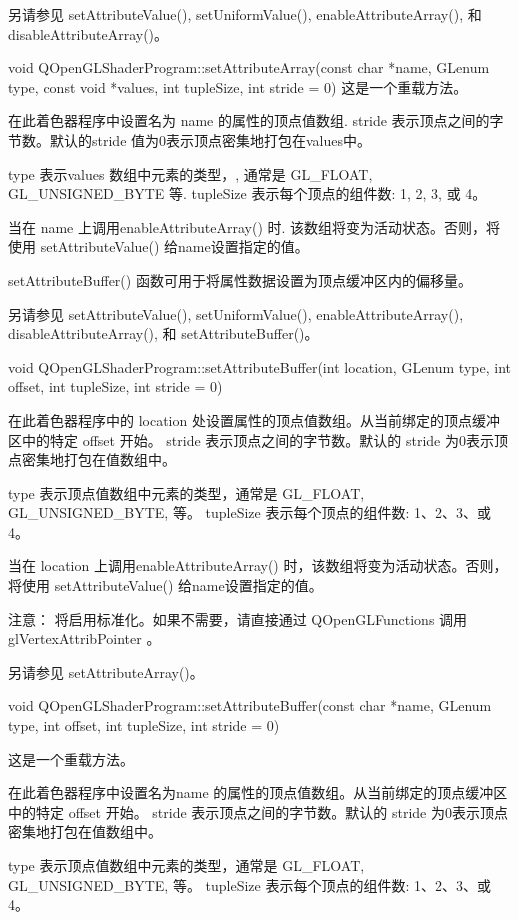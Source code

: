 另请参见 setAttributeValue(), setUniformValue(), enableAttributeArray(), 和 disableAttributeArray()。

void QOpenGLShaderProgram::setAttributeArray(const char *name, GLenum type, const void *values, int tupleSize, int stride = 0)
这是一个重载方法。

在此着色器程序中设置名为 name 的属性的顶点值数组. stride 表示顶点之间的字节数。默认的stride 值为0表示顶点密集地打包在values中。

type 表示values 数组中元素的类型，, 通常是 GL\_FLOAT, GL\_UNSIGNED\_BYTE 等. tupleSize 表示每个顶点的组件数: 1, 2, 3, 或 4。

当在 name 上调用enableAttributeArray() 时. 该数组将变为活动状态。否则，将使用 setAttributeValue() 给name设置指定的值。

setAttributeBuffer() 函数可用于将属性数据设置为顶点缓冲区内的偏移量。

另请参见 setAttributeValue(), setUniformValue(), enableAttributeArray(), disableAttributeArray(), 和 setAttributeBuffer()。

void QOpenGLShaderProgram::setAttributeBuffer(int location, GLenum type, int offset, int tupleSize, int stride = 0)

在此着色器程序中的 location 处设置属性的顶点值数组。从当前绑定的顶点缓冲区中的特定 offset 开始。 stride 表示顶点之间的字节数。默认的 stride 为0表示顶点密集地打包在值数组中。

type 表示顶点值数组中元素的类型，通常是 GL\_FLOAT, GL\_UNSIGNED\_BYTE, 等。 tupleSize 表示每个顶点的组件数: 1、2、3、或 4。

当在 location 上调用enableAttributeArray() 时，该数组将变为活动状态。否则，将使用 setAttributeValue() 给name设置指定的值。

注意： 将启用标准化。如果不需要，请直接通过 QOpenGLFunctions 调用glVertexAttribPointer 。

另请参见 setAttributeArray()。

void QOpenGLShaderProgram::setAttributeBuffer(const char *name, GLenum type, int offset, int tupleSize, int stride = 0)

这是一个重载方法。

在此着色器程序中设置名为name 的属性的顶点值数组。从当前绑定的顶点缓冲区中的特定 offset 开始。 stride 表示顶点之间的字节数。默认的 stride 为0表示顶点密集地打包在值数组中。

type 表示顶点值数组中元素的类型，通常是 GL\_FLOAT, GL\_UNSIGNED\_BYTE, 等。 tupleSize 表示每个顶点的组件数: 1、2、3、或 4。

